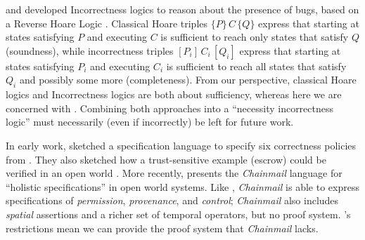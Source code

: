 \citeauthor{IncorrectnessLogic} and \citeauthor{IncorrectSeparation}
developed Incorrectness logics to reason about the presence of bugs, 
based on a Reverse Hoare Logic \cite{reverseHoare}.
Classical Hoare triples $\{ P \}\, C\, \{ Q \}$ express  that starting 
at states satisfying $P$ and executing   $C$  is sufficient to reach only states
that satisfy $ Q $ (soundness), while
 incorrectness triples $[ P_i ]\, C_i\, [ Q _i ]$ express  that starting at  
 states satisfying $P_i$ and executing  $C_i$ is sufficient to reach 
 all states that satisfy $Q_i$ and possibly some more (completeness).
From our perspective, classical Hoare logics and Incorrectness logics
are both about sufficiency, whereas here we are concerned with \Nec.
Combining both approaches into a ``necessity incorrectness logic''
must necessarily (even if incorrectly) be left for future work.


In early work, 
\cite{WAS-OOPSLA14-TR} %
sketched a  specification language to
specify six correctness policies from \cite{MillerPhD}. %
They also
  sketched how 
a trust-sensitive 
example (escrow) could be verified in an open world
\cite{swapsies}. More recently, 
\cite{FASE} presents the \emph{Chainmail} language for
``holistic specifications'' in open world systems.
Like \Nec, \emph{Chainmail} is able to express specifications of
\emph{permission}, \emph{provenance}, and \emph{control}; \emph{Chainmail}
also includes \emph{spatial} assertions and a richer set of temporal
operators, but no proof system. 
\Nec's restrictions mean 
we can provide the proof system that \emph{Chainmail} lacks.


